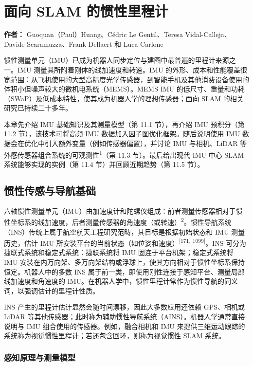 \chapter{面向 SLAM 的惯性里程计}

\textbf{作者：} Guoquan（Paul）Huang、Cédric Le Gentil、Teresa Vidal-Calleja、Davide Scaramuzza、Frank Dellaert 和 Luca Carlone

惯性测量单元（IMU）已成为机器人同步定位与建图中最普遍的里程计来源之一。IMU 测量其所附着刚体的线加速度和转速。IMU 的外形、成本和性能覆盖很宽范围：从飞机使用的大型高精度光学传感器，到智能手机及其他消费设备使用的体积小但噪声较大的微机电系统（MEMS）。MEMS IMU 的低尺寸、重量和功耗（SWaP）及低成本特性，使其成为机器人学的理想传感器；面向 SLAM 的相关研究已持续二十多年。

本章先介绍 IMU 基础知识及其测量模型（第 11.1 节），再介绍 IMU 预积分（第 11.2 节），该技术可将高频 IMU 数据加入因子图优化框架。随后说明使用 IMU 数据会在优化中引入额外变量（例如传感器偏置），并讨论 IMU 与相机、LiDAR 等外感传感器组合系统的可观测性\textsuperscript{1}（第 11.3 节）。最后给出现代 IMU 中心 SLAM 系统能够实现的实例（第 11.4 节）并回顾近期趋势（第 11.5 节）。

\section{惯性传感与导航基础}

六轴惯性测量单元（IMU）由加速度计和陀螺仪组成：前者测量传感器相对于惯性坐标系的线加速度，后者测量传感器的角速度（或转速）\textsuperscript{2}。惯性导航系统（INS）传统上属于航空航天工程研究范畴，其目标是根据初始状态和 IMU 测量历史，估计 IMU 所安装平台的当前状态（如位姿和速度）\textsuperscript{[171, 1099]}。INS 可分为捷联式系统和稳定式系统：捷联系统将 IMU 固连于平台机架；稳定式系统将 IMU 安装在内万向架、多万向架结构或浮球上，使其方向相对于惯性坐标系保持恒定。机器人中的多数 INS 属于前一类，即使用刚性连接于感知平台、测量局部线加速度和角速度的 IMU。在机器人学中，惯性里程计常作为惯性导航的同义词，以强调估计的里程计性质。

INS 产生的里程计估计显然会随时间漂移，因此大多数应用还依赖 GPS、相机或 LiDAR 等其他传感器；此时称为辅助惯性导航系统（AINS）。机器人学通常直接说明与 IMU 组合使用的传感器。例如，融合相机和 IMU 来提供三维运动跟踪的系统称为视觉惯性里程计；若还包含回环，则称为视觉惯性 SLAM 系统。

\subsection{感知原理与测量模型}

